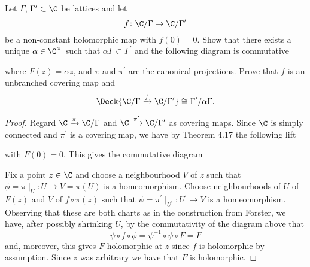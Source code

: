 \documentclass[10pt]{amsart}
\begin{document}
\begin{thm}
  Let $\Gamma$, $\Gamma^\prime \subset \C$ be lattices and let
  $$f \colon \C / \Gamma \rightarrow \C / \Gamma^\prime$$
  be a non-constant holomorphic map with $f(0) = 0$.
  Show that there exists a unique $\alpha \in \C^\times$ such that $\alpha\Gamma \subset \Gamma^\prime$ and the following diagram is commutative
  \begin{center}
  \end{center}
  where $F(z) = \alpha z$, and $\pi$ and $\pi^\prime$ are the canonical projections.
  Prove that $f$ is an unbranched covering map and
  $$\Deck{\C/\Gamma \xrightarrow{f} \C/\Gamma^\prime} \cong \Gamma^\prime / \alpha\Gamma.$$

  \begin{proof}
    Regard $\C \xrightarrow{\pi} \C/\Gamma$ and $\C \xrightarrow{\pi^\prime} \C/\Gamma^\prime$ as covering maps.
    Since $\C$ is simply connected and $\pi^\prime$ is a covering map, we have by Theorem 4.17 the following lift
    \begin{center}
    \end{center}
    with $F(0) = 0$.
    This gives the commutative diagram
    \begin{center}
    \end{center}
    
    Fix a point $z \in \C$ and choose a neighbourhood $V$ of $z$ such that $\phi = \pi \mid_U \colon U \rightarrow V = \pi(U)$ is a homeomorphism.
    Choose neighbourhoods of $U$ of $F(z)$ and $V$ of $f \circ \pi(z)$ such that $\psi = \pi^\prime \mid_{U^\prime} \colon U^\prime \rightarrow V$ is a homeomorphism.
    Observing that these are both charts as in the construction from Forster, we have, after possibly shrinking $U$, by the commutativity of the diagram above that
    $$\psi \circ f \circ \phi= \psi^{-1} \circ \psi \circ F = F$$
    and, moreover, this gives $F$ holomorphic at $z$ since $f$ is holomorphic by assumption.
    Since $z$ was arbitrary we have that $F$ is holomorphic.
    

\end{proof}
\end{thm}
\end{document}
